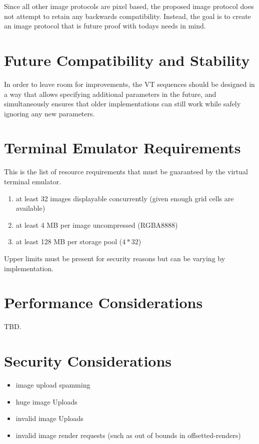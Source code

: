 \documentclass[a4paper]{article}
\begin{document}
Since all other image protocols are pixel based, the proposed image protocol does not
attempt to retain any backwards compatibility. Instead, the goal is to create
an image protocol that is future proof with todays needs in mind.

\section{Future Compatibility and Stability} %

In order to leave room for improvements, the VT sequences should be designed in a way
that allows specifying additional parameters in the future, and simultaneously ensures
that older implementations can still work while safely ignoring any new parameters.

\section{Terminal Emulator Requirements} %

This is the list of resource requirements that must be guaranteed
by the virtual terminal emulator.

\begin{enumerate}
    \item at least 32 images displayable concurrently
          (given enough grid cells are available)
    \item at least 4 MB per image uncompressed (RGBA8888)
    \item at least 128 MB per storage pool (\(4 * 32\))
\end{enumerate}

Upper limits must be present for security reasons but can be varying by implementation.


\section{Performance Considerations} %

TBD.

\section{Security Considerations} %

\begin{itemize}
    \item image upload spamming
    \item huge image Uploads
    \item invalid image Uploads
    \item invalid image render requests (such as out of bounds in offsetted-renders)
\end{itemize}
\end{document}
